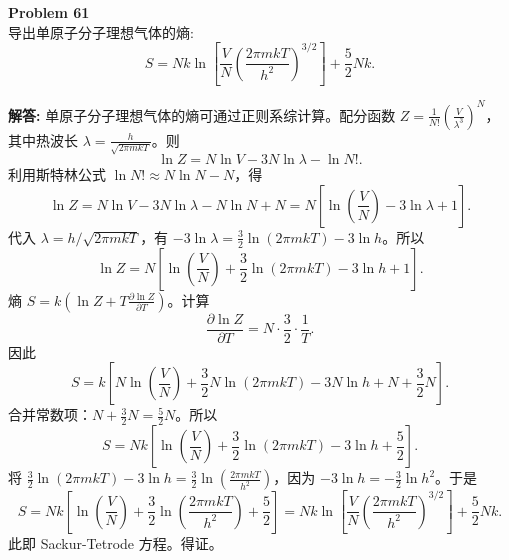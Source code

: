 \documentclass[12pt, a4paper, oneside]{ctexart}
\newenvironment{solution}{\par\noindent\textbf{解答:}\quad}{\par}
\begin{document}
\begin{mdframed}[backgroundcolor=gray!10, linewidth=0pt]
    \textbf{Problem 61} \\
    导出单原子分子理想气体的熵:
    \[
    S = N k \ln\left[ \frac{V}{N} \left( \frac{2\pi m k T}{h^2} \right)^{3/2} \right] + \frac{5}{2} N k.
    \]
\end{mdframed}
\begin{solution}
    单原子分子理想气体的熵可通过正则系综计算。配分函数 $Z = \frac{1}{N!} \left( \frac{V}{\lambda^3} \right)^N$，其中热波长 $\lambda = \frac{h}{\sqrt{2\pi m k T}}$。则
    \[
    \ln Z = N \ln V - 3N \ln \lambda - \ln N!.
    \]
    利用斯特林公式 $\ln N! \approx N \ln N - N$，得
    \[
    \ln Z = N \ln V - 3N \ln \lambda - N \ln N + N = N \left[ \ln \left( \frac{V}{N} \right) - 3 \ln \lambda + 1 \right].
    \]
    代入 $\lambda = h / \sqrt{2\pi m k T}$，有 $-3 \ln \lambda = \frac{3}{2} \ln (2\pi m k T) - 3 \ln h$。所以
    \[
    \ln Z = N \left[ \ln \left( \frac{V}{N} \right) + \frac{3}{2} \ln (2\pi m k T) - 3 \ln h + 1 \right].
    \]
    熵 $S = k \left( \ln Z + T \frac{\partial \ln Z}{\partial T} \right)$。计算
    \[
    \frac{\partial \ln Z}{\partial T} = N \cdot \frac{3}{2} \cdot \frac{1}{T}.
    \]
    因此
    \[
    S = k \left[ N \ln \left( \frac{V}{N} \right) + \frac{3}{2} N \ln (2\pi m k T) - 3N \ln h + N + \frac{3}{2} N \right].
    \]
    合并常数项：$N + \frac{3}{2} N = \frac{5}{2} N$。所以
    \[
    S = N k \left[ \ln \left( \frac{V}{N} \right) + \frac{3}{2} \ln (2\pi m k T) - 3 \ln h + \frac{5}{2} \right].
    \]
    将 $\frac{3}{2} \ln (2\pi m k T) - 3 \ln h = \frac{3}{2} \ln \left( \frac{2\pi m k T}{h^2} \right)$，因为 $-3 \ln h = -\frac{3}{2} \ln h^2$。于是
    \[
    S = N k \left[ \ln \left( \frac{V}{N} \right) + \frac{3}{2} \ln \left( \frac{2\pi m k T}{h^2} \right) + \frac{5}{2} \right] = N k \ln\left[ \frac{V}{N} \left( \frac{2\pi m k T}{h^2} \right)^{3/2} \right] + \frac{5}{2} N k.
    \]
    此即 Sackur-Tetrode 方程。得证。
\end{solution}
\end{document}

